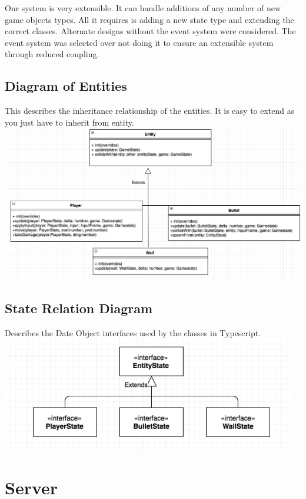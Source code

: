 \documentclass[12pt]{report}
\begin{document}
Our system is very extensible. It can handle additions of any number of new game objects types. All it requires is adding a new state type and extending the correct classes. Alternate designs without the event system were considered. The event system was selected over not doing it to ensure an extensible system through reduced coupling. 

\subsection{Diagram of Entities}
This describes the inheritance relationship of the entities. It is easy to extend as you just have to inherit from entity.\\
\includegraphics[width=\linewidth]{images/entities.png}

\subsection{State Relation Diagram}
Describes the Date Object interfaces used by the classes in Typescript. \\
\includegraphics[width=\linewidth,height=5cm]{images/data_objects.png}


\section{Server}
\end{document}
